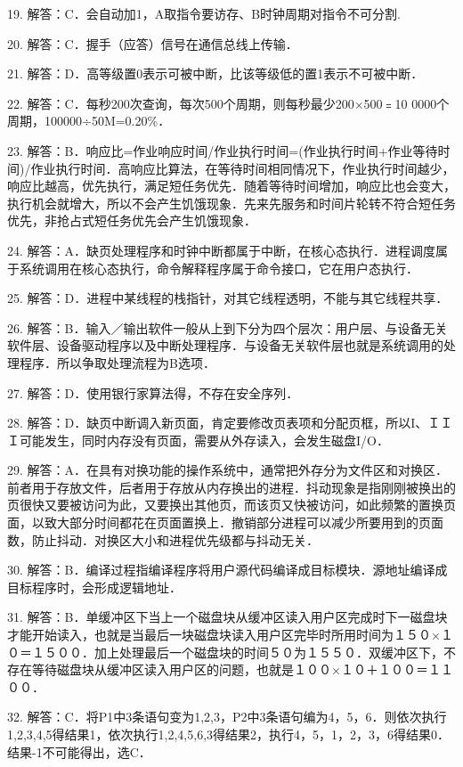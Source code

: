 19. 解答：C．会自动加1，A取指令要访存、B时钟周期对指令不可分割.

20. 解答：C．握手（应答）信号在通信总线上传输．

21. 解答：D．高等级置0表示可被中断，比该等级低的置1表示不可被中断．

22. 解答：C．每秒200次查询，每次500个周期，则每秒最少200×500﹦10 0000个周期，100000÷50M=0.20\%．

23. 解答：B．响应比=作业响应时间/作业执行时间=(作业执行时间+作业等待时间)/作业执行时间．高响应比算法，在等待时间相同情况下，作业执行时间越少，响应比越高，优先执行，满足短任务优先．随着等待时间增加，响应比也会变大，执行机会就增大，所以不会产生饥饿现象．先来先服务和时间片轮转不符合短任务优先，非抢占式短任务优先会产生饥饿现象．

24. 解答：A．缺页处理程序和时钟中断都属于中断，在核心态执行．进程调度属于系统调用在核心态执行，命令解释程序属于命令接口，它在用户态执行．

25. 解答：D．进程中某线程的栈指针，对其它线程透明，不能与其它线程共享．

26. 解答：B．输入／输出软件一般从上到下分为四个层次：用户层、与设备无关软件层、设备驱动程序以及中断处理程序．与设备无关软件层也就是系统调用的处理程序．所以争取处理流程为B选项．

27. 解答：D．使用银行家算法得，不存在安全序列．

28. 解答：D．缺页中断调入新页面，肯定要修改页表项和分配页框，所以I、ＩＩＩ可能发生，同时内存没有页面，需要从外存读入，会发生磁盘I/O．

29. 解答：A．在具有对换功能的操作系统中，通常把外存分为文件区和对换区．前者用于存放文件，后者用于存放从内存换出的进程．抖动现象是指刚刚被换出的页很快又要被访问为此，又要换出其他页，而该页又快被访问，如此频繁的置换页面，以致大部分时间都花在页面置换上．撤销部分进程可以减少所要用到的页面数，防止抖动．对换区大小和进程优先级都与抖动无关．

30. 解答：B．编译过程指编译程序将用户源代码编译成目标模块．源地址编译成目标程序时，会形成逻辑地址．

31. 解答：B．单缓冲区下当上一个磁盘块从缓冲区读入用户区完成时下一磁盘块才能开始读入，也就是当最后一块磁盘块读入用户区完毕时所用时间为１５０×１０＝１５００．加上处理最后一个磁盘块的时间５０为１５５０．双缓冲区下，不存在等待磁盘块从缓冲区读入用户区的问题，也就是１００×１０＋１００＝１１００．

32. 解答：C．将P1中3条语句变为1,2,3，P2中3条语句编为4，5，6．则依次执行1,2,3,4,5得结果1，依次执行1,2,4,5,6,3得结果2，执行4，5，1，2，3，6得结果0．结果-1不可能得出，选C．

